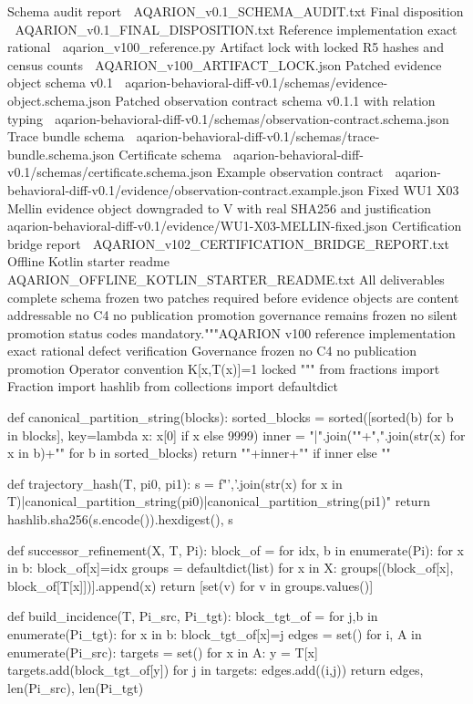 Schema audit report
📎 AQARION_v0.1_SCHEMA_AUDIT.txt
Final disposition
📎 AQARION_v0.1_FINAL_DISPOSITION.txt
Reference implementation exact rational
📎 aqarion_v100_reference.py
Artifact lock with locked R5 hashes and census counts
📎 AQARION_v100_ARTIFACT_LOCK.json
Patched evidence object schema v0.1
📎 aqarion-behavioral-diff-v0.1/schemas/evidence-object.schema.json
Patched observation contract schema v0.1.1 with relation typing
📎 aqarion-behavioral-diff-v0.1/schemas/observation-contract.schema.json
Trace bundle schema
📎 aqarion-behavioral-diff-v0.1/schemas/trace-bundle.schema.json
Certificate schema
📎 aqarion-behavioral-diff-v0.1/schemas/certificate.schema.json
Example observation contract
📎 aqarion-behavioral-diff-v0.1/evidence/observation-contract.example.json
Fixed WU1 X03 Mellin evidence object downgraded to V with real SHA256 and justification
📎 aqarion-behavioral-diff-v0.1/evidence/WU1-X03-MELLIN-fixed.json
Certification bridge report
📎 AQARION_v102_CERTIFICATION_BRIDGE_REPORT.txt
Offline Kotlin starter readme
📎 AQARION_OFFLINE_KOTLIN_STARTER_README.txt
All deliverables complete schema frozen two patches required before evidence objects are content addressable no C4 no publication promotion governance remains frozen no silent promotion status codes mandatory."""AQARION v100 reference implementation exact rational defect verification
Governance frozen no C4 no publication promotion
Operator convention K[x,T(x)]=1 locked
"""
from fractions import Fraction
import hashlib
from collections import defaultdict

def canonical_partition_string(blocks):
    sorted_blocks = sorted([sorted(b) for b in blocks], key=lambda x: x[0] if x else 9999)
    inner = "|".join("{"+",".join(str(x) for x in b)+"}" for b in sorted_blocks)
    return "{"+inner+"}" if inner else "{}"

def trajectory_hash(T, pi0, pi1):
    s = f"{','.join(str(x) for x in T)}|{canonical_partition_string(pi0)}|{canonical_partition_string(pi1)}"
    return hashlib.sha256(s.encode()).hexdigest(), s

def successor_refinement(X, T, Pi):
    block_of = {}
    for idx, b in enumerate(Pi):
        for x in b:
            block_of[x]=idx
    groups = defaultdict(list)
    for x in X:
        groups[(block_of[x], block_of[T[x]])].append(x)
    return [set(v) for v in groups.values()]

def build_incidence(T, Pi_src, Pi_tgt):
    block_tgt_of = {}
    for j,b in enumerate(Pi_tgt):
        for x in b:
            block_tgt_of[x]=j
    edges = set()
    for i, A in enumerate(Pi_src):
        targets = set()
        for x in A:
            y = T[x]
            targets.add(block_tgt_of[y])
        for j in targets:
            edges.add((i,j))
    return edges, len(Pi_src), len(Pi_tgt)

